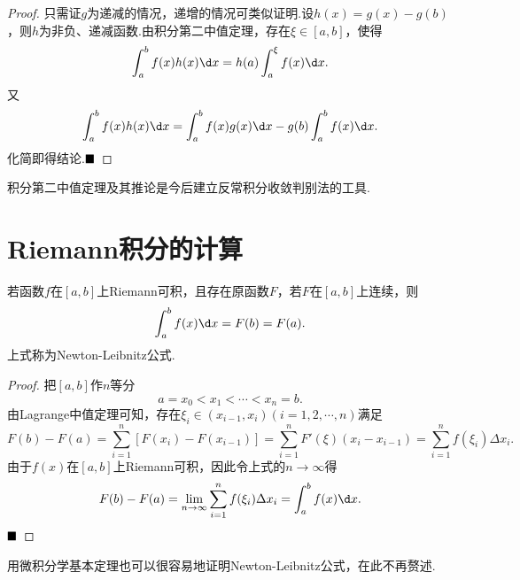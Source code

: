 \begin{proof}
	只需证$g$为递减的情况，递增的情况可类似证明.设$h(x)=g(x)-g(b)$，则$h$为非负、递减函数.由积分第二中值定理，存在$\xi\in\left[a,b\right]$，使得
	$$\int_{a}^{b}f(x)h(x)\d x=h(a)\int_{a}^{\xi}f(x)\d x.$$
	又
	$$\int_{a}^{b}f(x)h(x)\d x=\int_{a}^{b}f(x)g(x)\d x-g(b)\int_{a}^{b}f(x)\d x.$$
	化简即得结论.$\hfill\blacksquare$
\end{proof}
\begin{remark}
	积分第二中值定理及其推论是今后建立反常积分收敛判别法的工具.
\end{remark}
\section{Riemann积分的计算}
\begin{theorem}
	若函数$f$在$\left[a,b\right]$上Riemann可积，且存在原函数$F$，若$F$在$\left[a,b\right]$上连续，则
	$$\int_{a}^{b}f(x)\d x=F(b)=F(a).$$
	上式称为{\heiti Newton-Leibnitz公式}.
\end{theorem}
\begin{proof}
	把$\left[a,b\right]$作$n$等分
	$$a=x_0<x_1<\cdots<x_n=b.$$
	由Lagrange中值定理可知，存在$\xi_i\in(x_{i-1},x_i)(i=1,2,\cdots,n)$满足
	$$F(b)-F(a)=\sum_{i=1}^{n}\left[F(x_i)-F(x_{i-1})\right]=\sum_{i=1}^{n}F'(\xi)(x_i-x_{i-1})=\sum_{i=1}^{n}f(\xi_i)\Delta x_i.$$
	由于$f(x)$在$\left[a,b\right]$上Riemann可积，因此令上式的$n\to\infty$得
	$$F(b)-F(a)=\lim\limits_{n\to\infty}\sum_{i=1}^{n}f(\xi_i)\Delta x_i=\int_{a}^{b}f(x)\d x.$$
	$\hfill\blacksquare$
\end{proof}
\begin{remark}
	用微积分学基本定理也可以很容易地证明Newton-Leibnitz公式，在此不再赘述.
\end{remark}

